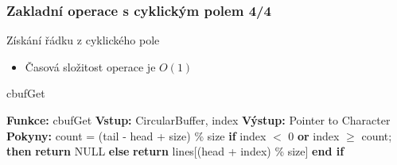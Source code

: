 \documentclass[]{fitthesispresn}
\begin{document}
    \begin{frame}
        \frametitle{Zakladní operace s cyklickým polem 4/4}
        Získání řádku z cyklického pole
        \begin{itemize}
            \item Časová složitost operace je $O(1)$
        \end{itemize}
        \begin{algorithm}[H]
            \caption{cbufGet}
            \label{alg:cbufGet}
            \begin{algorithmic}[1]
                \State \textbf{Funkce:} cbufGet
                \State \textbf{Vstup:} CircularBuffer, index
                \State \textbf{Výstup:} Pointer to Character
                \State \textbf{Pokyny:}
                \State \hspace{\algorithmicindent} count = (tail - head + size) \% size
                \State \hspace{\algorithmicindent} \textbf{if} index $<$ 0 \textbf{or} index $\geq$ count; \textbf{then}
                \State \hspace{\algorithmicindent} \hspace{\algorithmicindent} \textbf{return} NULL
                \State \hspace{\algorithmicindent} \textbf{else}
                \State \hspace{\algorithmicindent} \hspace{\algorithmicindent} \textbf{return} lines[(head + index) \% size]
                \State \hspace{\algorithmicindent} \textbf{end if}
            \end{algorithmic}
        \end{algorithm}
    \end{frame}

\end{document}
